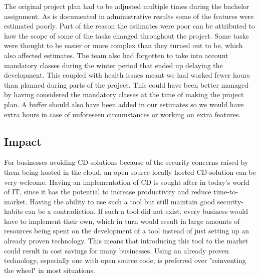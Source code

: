 

The original project plan had to be adjusted multiple times during the bachelor assignment. As is documented in administrative results some of the features were estimated poorly. Part of the reason the estimates were poor can be attributed to how the scope of some of the tasks changed throughout the project. Some tasks were thought to be easier or more complex than they turned out to be, which also affected estimates. The team also had forgotten to take into account mandatory classes during the winter period that ended up delaying the development. This coupled with health issues meant we had worked fewer hours than planned during parts of the project. This could have been better managed by having considered the mandatory classes at the time of making the project plan. A buffer should also have been added in our estimates so we would have extra hours in case of unforeseen circumstances or working on extra features.

\subsection{Impact}

For businesses avoiding \acrshort{CD}-solutions because of the security concerns raised by them being hosted in the cloud, an open source locally hosted \acrshort{CD}-solution can be very welcome. Having an implementation of \acrlong{CD} is sought after in today's world of IT, since it has the potential to increase productivity and reduce time-to-market. Having the ability to use such a tool but still maintain good security-habits can be a contradiction. If such a tool did not exist, every business would have to implement their own, which in turn would result in large amounts of resources being spent on the development of a tool instead of just setting up an already proven technology. This means that introducing this tool to the market could result in cost savings for many businesses. Using an already proven technology, especially one with open source code, is preferred over "reinventing the wheel" in most situations.

